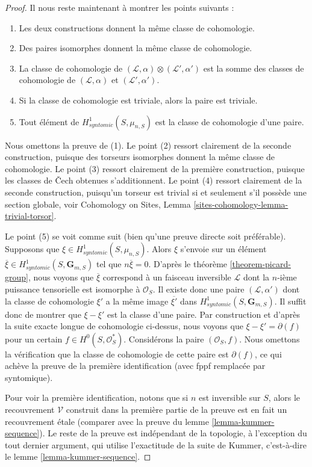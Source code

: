 \begin{proof}
\medskip\noindent
Il nous reste maintenant \`a montrer les points suivants :
\begin{enumerate}
\item Les deux constructions donnent la m\^eme classe de cohomologie.
\item Des paires isomorphes donnent la m\^eme classe de cohomologie.
\item La classe de cohomologie de
$(\mathcal{L}, \alpha) \otimes (\mathcal{L}', \alpha')$
est la somme des classes de cohomologie de
$(\mathcal{L}, \alpha)$ et $(\mathcal{L}', \alpha')$.
\item Si la classe de cohomologie est triviale, alors la paire est triviale.
\item Tout \'el\'ement de $H^1_{syntomic}(S, \mu_{n, S})$ est la
classe de cohomologie d'une paire.
\end{enumerate}
Nous omettons la preuve de (1). Le point (2) ressort clairement de la seconde construction,
puisque des torseurs isomorphes donnent la m\^eme classe de cohomologie.
Le point (3) ressort clairement de la premi\`ere construction, puisque les classes de
{\v C}ech obtenues s'additionnent. Le point (4) ressort clairement de la seconde construction,
puisqu'un torseur est trivial si et seulement s'il poss\`ede une section globale, voir
Cohomology on Sites, Lemma \ref{sites-cohomology-lemma-trivial-torsor}.

\medskip\noindent
Le point (5) se voit comme suit (bien qu'une preuve directe soit
pr\'ef\'erable). Supposons que $\xi \in H^1_{syntomic}(S, \mu_{n, S})$.
Alors $\xi$ s'envoie sur un \'el\'ement
$\overline{\xi} \in H^1_{syntomic}(S, \mathbf{G}_{m, S})$
tel que $n \overline{\xi} = 0$. D'apr\`es le
th\'eor\`eme \ref{theorem-picard-group},
nous voyons que $\overline{\xi}$ correspond \`a un faisceau inversible $\mathcal{L}$
dont la $n$-i\`eme puissance tensorielle est isomorphe \`a $\mathcal{O}_S$.
Il existe donc une paire $(\mathcal{L}, \alpha')$ dont la classe de cohomologie
$\xi'$ a la m\^eme image $\overline{\xi'}$ dans
$H^1_{syntomic}(S, \mathbf{G}_{m, S})$. Il suffit donc de montrer
que $\xi - \xi'$ est la classe d'une paire. Par construction et d'apr\`es la
suite exacte longue de cohomologie ci-dessus, nous voyons que
$\xi - \xi' = \partial(f)$ pour un certain $f \in H^0(S, \mathcal{O}_S^*)$.
Consid\'erons la paire $(\mathcal{O}_S, f)$. Nous omettons la v\'erification
que la classe de cohomologie de cette paire est $\partial(f)$, ce qui
ach\`eve la preuve de la premi\`ere identification (avec fppf remplac\'ee
par syntomique).

\medskip\noindent
Pour voir la premi\`ere identification, notons que si $n$ est inversible sur $S$, alors le
recouvrement $\mathcal{V}$ construit dans la premi\`ere partie de la preuve
est en fait un recouvrement \'etale (comparer avec la preuve du
lemme \ref{lemma-kummer-sequence}). Le reste de la preuve est ind\'ependant
de la topologie, \`a l'exception du tout dernier argument, qui utilise l'exactitude de
la suite de Kummer, c'est-\`a-dire le lemme \ref{lemma-kummer-sequence}.
\end{proof}






